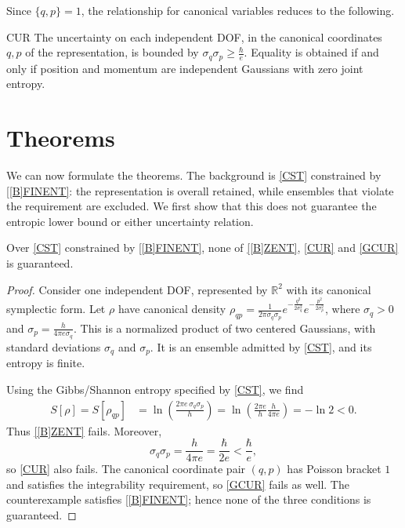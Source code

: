 \documentclass{techbrief}
\begin{document}
Since $\{q,p\}=1$, the relationship for canonical variables reduces to the following.
\begin{condition}{CUR}
	The uncertainty on each independent DOF, in the canonical coordinates $q,p$ of the representation, is bounded by $\sigma_q\sigma_p\geq\frac{\hbar}{e}$. Equality is obtained if and only if position and momentum are independent Gaussians with zero joint entropy.
\end{condition}

\section{Theorems}

We can now formulate the theorems. The background is \ref{CST} constrained by \ref{[B]FINENT}: the representation is overall retained, while ensembles that violate the requirement are excluded. We first show that this does not guarantee the entropic lower bound or either uncertainty relation.

\begin{thrm}
	Over \ref{CST} constrained by \ref{[B]FINENT}, none of \ref{[B]ZENT}, \ref{CUR} and \ref{GCUR} is guaranteed.
\end{thrm}

\begin{proof}
	Consider one independent DOF, represented by $\mathbb{R}^2$ with its canonical symplectic form. Let $\rho$ have canonical density $\rho_{qp}=\frac{1}{2\pi\sigma_q\sigma_p}e^{-\frac{q^2}{2\sigma_q^2}}e^{-\frac{p^2}{2\sigma_p^2}}$, where $\sigma_q>0$ and $\sigma_p=\frac{h}{4\pi e \sigma_q }$. This is a normalized product of two centered Gaussians, with standard deviations $\sigma_q$ and $\sigma_p$. It is an ensemble admitted by \ref{CST}, and its entropy is finite.

	Using the Gibbs/Shannon entropy specified by \ref{CST}, we find
	\begin{equation*}
		\begin{aligned}
			S[\rho]=S[\rho_{qp}]
			&=\ln\left(\frac{2\pi e\,\sigma_q\sigma_p}{h}\right)=\ln\left(\frac{2\pi e}{h}\frac{h}{4\pi e}\right)
			=-\ln2<0.
		\end{aligned}
	\end{equation*}
	Thus \ref{[B]ZENT} fails. Moreover,
	\begin{equation*}
		\sigma_q\sigma_p
		=\frac{h}{4\pi e}
		=\frac{\hbar}{2e}
		<\frac{\hbar}{e},
	\end{equation*}
	so \ref{CUR} also fails. The canonical coordinate pair $(q,p)$ has Poisson bracket $1$ and satisfies the integrability requirement, so \ref{GCUR} fails as well. The counterexample satisfies \ref{[B]FINENT}; hence none of the three conditions is guaranteed.
\end{proof}
\end{document}
